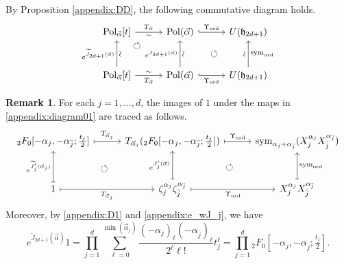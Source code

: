 \documentclass[a4paper,11pt,reqno]{amsart}
\newcommand{\frakh}{\mathfrak{h}}
\newcommand{\0}{{\bf 0}}
\newcommand{\1}{{\bf 1}}
\DeclareMathOperator{\Pol}{Pol}
\newcommand{\ord}{{\mathrm{ord}}}
\newcommand{\wJ}{\widetilde{J}}
\newcommand{\valpha}{\vec{\alpha}}
\DeclareMathOperator{\sym}{sym}
\theoremstyle{plain}
\theoremstyle{definition}
\newtheorem{remark}[equation]{Remark}
\numberwithin{equation}{section}
\theoremstyle{definition}
\begin{document}
\begin{appendices}
By Proposition \ref{appendix:DD},
the following commutative diagram  holds.
\begin{equation}\label{appendix:diagram01}
\begin{tikzcd}[row sep=1cm, column sep=1cm]
\Pol_{\valpha}[t]
\arrow[dr, pos=0.2, phantom, "\circlearrowleft"]
\arrow[r, "T_{\valpha}", "\sim"']
& 
\Pol(\valpha)
\arrow[r, "\Upsilon_{\ord}", hook]
& 
U(\frakh_{2d+1})
\arrow[dl, pos=0.5, phantom, "\circlearrowleft"]
\\
\Pol_{\valpha}[t]
\arrow[u, "e^{\wJ_{2d+1}(\valpha)}","\sim"' sloped]
\arrow[r,  "\sim", "T_{\valpha}"']
& 
\Pol(\valpha)
\arrow[u, "e^{ J_{2d+1}(\valpha)}","\sim"' sloped]
\arrow[r, "\Upsilon_{\ord}"', hook]
& U(\frakh_{2d+1})
\arrow[u, "\sim" sloped, "\sym_{\ord}"']
\end{tikzcd}
\end{equation}

\begin{remark}\label{appendix:Heis_2F0}
For each $j=1,\ldots, d$,  the images of $1$ under the maps
 in \eqref{appendix:diagram01} are traced as 
follows.
\begin{equation*}
\begin{tikzcd}[row sep=1cm, column sep=1cm]
{}_2F_0[-\alpha_j, -\alpha_{\bar{j}};\tfrac{t_j}{2}]
\arrow[r, "T_{\valpha_j}", mapsto]
& 
T_{\valpha_j}({}_2F_0[-\alpha_j, -\alpha_{\bar{j}};\tfrac{t_j}{2}])
\arrow[dl, pos=0.5, phantom, "\circlearrowleft"]
\arrow[r, "\Upsilon_{\ord}", mapsto]
& 
\sym_{\alpha_j+\alpha_{\bar{j}}}(X_j^{\alpha_j}X_{\bar{j}}^{\alpha_{\bar{j}}})
\arrow[dl, pos=0.5, phantom, "\circlearrowleft"]
\\
1
\arrow[u, "e^{\wJ'_j(\valpha_j)}", mapsto]
\arrow[r, "T_{\valpha_j}"', mapsto]
& 
\zeta_j^{\alpha_j}\zeta_{\bar{j}}^{\alpha_{\bar{j}}}
\arrow[u, "e^{J_j'(\valpha)}",mapsto]
\arrow[r, "\Upsilon_{\ord}"', mapsto]
& X_j^{\alpha_j}X_{\bar{j}}^{\alpha_{\bar{j}}}
\arrow[u,  "\sym_{\ord}"', mapsto]
\end{tikzcd}
\end{equation*}
Moreover, by \eqref{appendix:D1} and \eqref{appendix:e_wJ_j}, we have
\begin{equation*}
e^{\wJ_{2d+1}(\valpha)} 1
= \prod_{j=1}^d
\sum_{\ell=0}^{\min(\valpha_j)}
\frac{(-\alpha_j)_\ell(-\alpha_{\bar{j}})_\ell}{2^\ell \ell!}t_j^\ell
=\prod_{j=1}^d {}_2F_0[-\alpha_j, -\alpha_{\bar{j}};\tfrac{t_j}{2}].
\end{equation*}
\end{remark}


\end{appendices}
\end{document}

